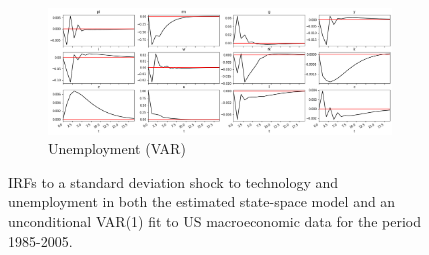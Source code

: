 \documentclass{article}
\begin{document}
\begin{figure}[!ht]
\begin{subfigure}{0.8\textwidth}
  \end{subfigure}
  \begin{subfigure}{0.8\textwidth}
    \includegraphics[width=\linewidth]{images/real_data_u_var_irf.png}
    \caption{Unemployment (VAR)}
    \label{us_u_var_irf}
  \end{subfigure}

  \caption{IRFs to a standard deviation shock to technology and unemployment in both the estimated state-space model and an unconditional VAR(1) fit to US macroeconomic data for the period 1985-2005.}
  \label{us_zu_irfs}
\end{figure}
\end{document}
